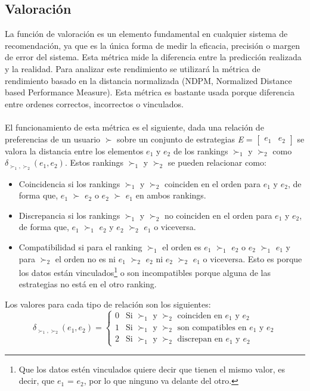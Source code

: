 \subsection{Valoración} \label{Valoracion}
La función de valoración es un elemento fundamental en cualquier sistema de recomendación, ya que es la única forma de medir la eficacia, precisión o margen de error del sistema. Esta métrica mide la diferencia entre  la predicción realizada y la realidad. Para analizar este rendimiento se utilizará la métrica de rendimiento basado en la distancia normalizada (NDPM, Normalized Distance based Performance Measure). Esta métrica es bastante usada porque diferencia entre ordenes correctos, incorrectos o vinculados.
\\ \\
El funcionamiento de esta métrica es el siguiente, dada una relación de preferencias de un usuario $\succ$ sobre un conjunto de estrategias \textit{E} = $\begin{bmatrix} \textit{e$_{1}$} & \textit{e$_{2}$} \end{bmatrix}$ se valora la distancia entre los elementos $e_1$ y $e_2$ de los rankings $\succ_1$ y $\succ_2$ como $\delta_{\succ_1, \succ_2}(e_1, e_2)$. Estos rankings $\succ_1$ y $\succ_2$ se pueden relacionar como:
\begin{itemize}
    \item Coincidencia si los rankings $\succ_1$ y $\succ_2$ coinciden en el orden para $e_1$ y $e_2$, de forma que, $e_1$ $\succ$ $e_2$ o $e_2$ $\succ$ $e_1$ en ambos rankings.
    \item Discrepancia si los rankings $\succ_1$ y $\succ_2$ no coinciden en el orden para $e_1$ y $e_2$, de forma que, $e_1$ $\succ_1$ $e_2$ y $e_2$ $\succ_2$ $e_1$ o viceversa. 
    \item Compatibilidad si para el ranking $\succ_1$ el orden es $e_1$ $\succ_1$ $e_2$ o $e_2$ $\succ_1$ $e_1$ y para $\succ_2$ el orden no es ni $e_1$ $\succ_2$ $e_2$ ni $e_2$ $\succ_2$ $e_1$ o viceversa. Esto es porque los datos están vinculados\footnote{Que los datos estén vinculados quiere decir que tienen el mismo valor, es decir, que $e_1$ = $e_2$, por lo que ninguno va delante del otro.} o son incompatibles porque alguna de las estrategias no está en el otro ranking.   
\end{itemize}
Los valores para cada tipo de relación son los siguientes: 
\[ 
    \delta_{\succ_1, \succ_2}(e_1, e_2) =
    \begin{cases} 
        \mbox{0} & \mbox{Si $\succ_1$ y $\succ_2$ coinciden en $e_1$ y $e_2$} \\
        \mbox{1} & \mbox{Si $\succ_1$ y $\succ_2$ son compatibles en $e_1$ y $e_2$} \\
        \mbox{2} & \mbox{Si $\succ_1$ y $\succ_2$ discrepan en $e_1$ y $e_2$}
    
    \end{cases}
\]
